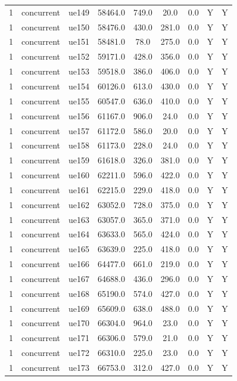 \begin{table}[ht]
\begin{tabular}{|c|c|c|c|c|c|c|c|c|}
1 & concurrent & ue149 & 58464.0 & 749.0 & 20.0 & 0.0 & Y & Y \\
1 & concurrent & ue150 & 58476.0 & 430.0 & 281.0 & 0.0 & Y & Y \\
1 & concurrent & ue151 & 58481.0 & 78.0 & 275.0 & 0.0 & Y & Y \\
1 & concurrent & ue152 & 59171.0 & 428.0 & 356.0 & 0.0 & Y & Y \\
1 & concurrent & ue153 & 59518.0 & 386.0 & 406.0 & 0.0 & Y & Y \\
1 & concurrent & ue154 & 60126.0 & 613.0 & 430.0 & 0.0 & Y & Y \\
1 & concurrent & ue155 & 60547.0 & 636.0 & 410.0 & 0.0 & Y & Y \\
1 & concurrent & ue156 & 61167.0 & 906.0 & 24.0 & 0.0 & Y & Y \\
1 & concurrent & ue157 & 61172.0 & 586.0 & 20.0 & 0.0 & Y & Y \\
1 & concurrent & ue158 & 61173.0 & 228.0 & 24.0 & 0.0 & Y & Y \\
1 & concurrent & ue159 & 61618.0 & 326.0 & 381.0 & 0.0 & Y & Y \\
1 & concurrent & ue160 & 62211.0 & 596.0 & 422.0 & 0.0 & Y & Y \\
1 & concurrent & ue161 & 62215.0 & 229.0 & 418.0 & 0.0 & Y & Y \\
1 & concurrent & ue162 & 63052.0 & 728.0 & 375.0 & 0.0 & Y & Y \\
1 & concurrent & ue163 & 63057.0 & 365.0 & 371.0 & 0.0 & Y & Y \\
1 & concurrent & ue164 & 63633.0 & 565.0 & 424.0 & 0.0 & Y & Y \\
1 & concurrent & ue165 & 63639.0 & 225.0 & 418.0 & 0.0 & Y & Y \\
1 & concurrent & ue166 & 64477.0 & 661.0 & 219.0 & 0.0 & Y & Y \\
1 & concurrent & ue167 & 64688.0 & 436.0 & 296.0 & 0.0 & Y & Y \\
1 & concurrent & ue168 & 65190.0 & 574.0 & 427.0 & 0.0 & Y & Y \\
1 & concurrent & ue169 & 65609.0 & 638.0 & 488.0 & 0.0 & Y & Y \\
1 & concurrent & ue170 & 66304.0 & 964.0 & 23.0 & 0.0 & Y & Y \\
1 & concurrent & ue171 & 66306.0 & 579.0 & 21.0 & 0.0 & Y & Y \\
1 & concurrent & ue172 & 66310.0 & 225.0 & 23.0 & 0.0 & Y & Y \\
1 & concurrent & ue173 & 66753.0 & 312.0 & 427.0 & 0.0 & Y & Y \\

\end{tabular}
\end{table}
